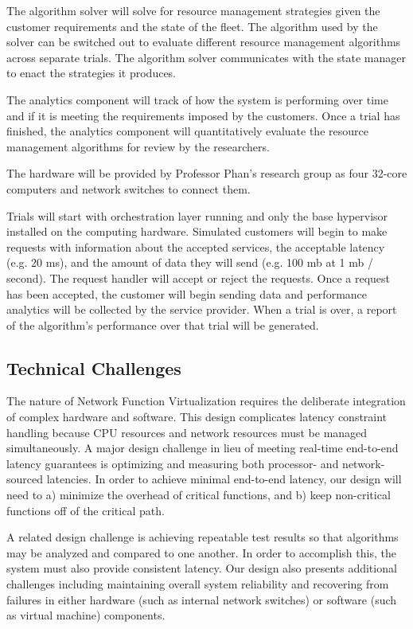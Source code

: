 \documentclass{sig-alternate}
\begin{document}
The algorithm solver will solve for resource management strategies given the customer requirements and the state of the fleet. The algorithm used by the solver can be switched out to evaluate different resource management algorithms across separate trials. The algorithm solver communicates with the state manager to enact the strategies it produces.

The analytics component will track of how the system is performing over time and if it is meeting the requirements imposed by the customers. Once a trial has finished, the analytics component will quantitatively evaluate the resource management algorithms for review by the researchers.

The hardware will be provided by Professor Phan's research group as four 32-core computers and network switches to connect them.

Trials will start with orchestration layer running and only the base hypervisor installed on the computing hardware. Simulated customers will begin to make requests with information about the accepted services, the acceptable latency (e.g. 20 ms), and the amount of data they will send (e.g. 100 mb at 1 mb / second). The request handler will accept or reject the requests. Once a request has been accepted, the customer will begin sending data and performance analytics will be collected by the service provider. When a trial is over, a report of the algorithm's performance over that trial will be generated.



\subsection{Technical Challenges}
\label{subsec:tech_challenges}

The nature of Network Function Virtualization requires the deliberate integration of complex hardware and software. This design complicates latency constraint handling because CPU resources and network resources must be managed simultaneously. A major design challenge in lieu of meeting real-time end-to-end latency guarantees is optimizing and measuring both processor- and network-sourced latencies. In order to achieve minimal end-to-end latency, our design will need to a) minimize the overhead of critical functions, and b) keep non-critical functions off of the critical path.

A related design challenge is achieving repeatable test results so that algorithms may be analyzed and compared to one another. In order to accomplish this, the system must also provide consistent latency. Our design also presents additional challenges including maintaining overall system reliability and recovering from failures in either hardware (such as internal network switches) or software (such as virtual machine) components.
\end{document}
